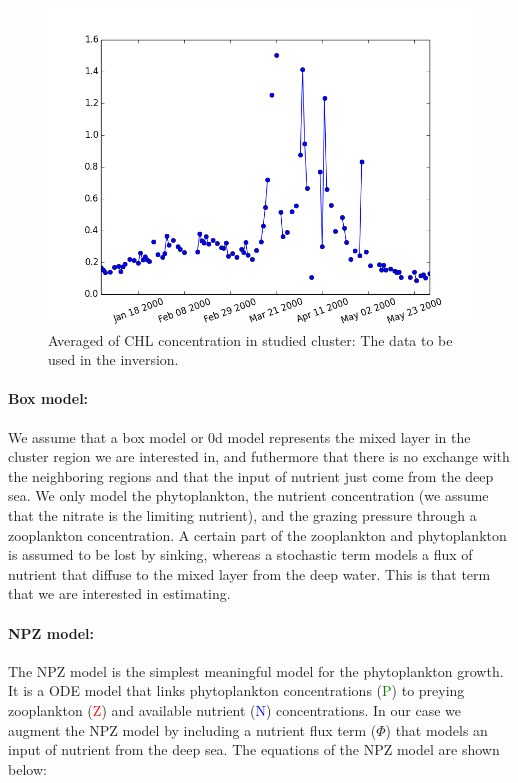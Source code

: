 \documentclass{article}
\begin{document}
  \begin{figure}[ht]
  \centering
    \includegraphics[scale=.3]{./chl_ts.png}
  \caption{Averaged of CHL concentration in studied cluster: The data to be used in the inversion.}
  \end{figure}


  \paragraph{Box model:}

  We assume that a box model or 0d model represents the mixed layer in the cluster region we are interested in, and futhermore that there is no exchange with the neighboring regions and that the input of nutrient just come from the deep sea. We only model the phytoplankton, the nutrient concentration (we assume that the nitrate is the limiting nutrient), and the grazing pressure through a zooplankton concentration. A certain part of the zooplankton and phytoplankton is assumed to be lost by sinking, whereas a stochastic term models a flux of nutrient that diffuse to the mixed layer from the deep water. This is that term that we are interested in estimating.

  \paragraph{NPZ model:}

  The NPZ model is the simplest meaningful model for the phytoplankton
  growth. It is a ODE model that links phytoplankton concentrations 
  (\textcolor{green}{P}) to preying zooplankton (\textcolor{red}{Z}) and
  available nutrient (\textcolor{blue}{N}) concentrations. In our case we 
  augment the NPZ model by including a nutrient flux term ($\Phi$) that 
  models an input of nutrient from the deep sea. The equations of the
  NPZ model are shown below:
\end{document}
